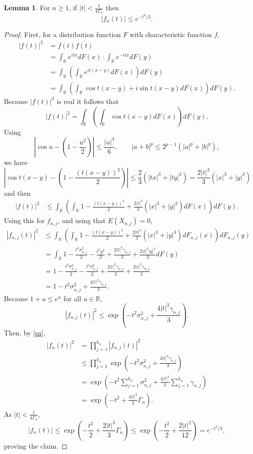 \documentclass{article}
\theoremstyle{definition}
\newtheorem{lemma}[theorem]{Lemma}
\theoremstyle{definition}
\begin{document}
\begin{lemma}
For $n \geq 1$, if $|t|<\frac{1}{4\Gamma_n}$ then
\[
|f_n(t)| \leq e^{-t^2/3}.
\] 
\label{Gamma2}
\end{lemma}
\begin{proof}
First, for a distribution function $F$ with characteristic function $f$,
\begin{align*}
|f(t)|^2 &= f(t) \overline{f(t)}\\
&= \int_\mathbb{R} e^{itx} dF(x) \cdot \int_\mathbb{R} e^{-itx} dF(y)\\
&=\int_\mathbb{R}\left( \int_\mathbb{R} e^{it(x-y)} dF(x) \right) dF(y)\\
&=\int_\mathbb{R}\left( \int_\mathbb{R} \cos t(x-y)+i\sin t(x-y) dF(x) \right) dF(y).
\end{align*}
Because $|f(t)|^2$ is real it follows that
\[
|f(t)|^2 = \int_\mathbb{R}\left( \int_\mathbb{R} \cos t(x-y) dF(x) \right) dF(y).
\]
Using
\[
\left| \cos u - \left(1 - \frac{u^2}{2}\right) \right| \leq \frac{|u|^3}{6},\qquad
|a+b|^p \leq 2^{p-1}(|a|^p+|b|^p), 
\]
we have
\[
\left| \cos t(x-y) -\left(1-\frac{(t(x-y))^2}{2} \right)\right| \leq \frac{2}{3}\left(|tx|^3+|ty|^3\right)
=\frac{2|t|^3}{3}(|x|^3+|y|^3)
\]
and then
\begin{align*}
|f(t)|^2&\leq \int_\mathbb{R} \left( \int_\mathbb{R} 1-\frac{(t(x-y))^2}{2}  
+ \frac{2|t|^3}{3}(|x|^3+|y|^3) dF(x) \right) dF(y).
\end{align*}
Using this for $f_{n,j}$, and using that $E(X_{n,j})=0$,
\begin{align*}
|f_{n,j}(t)|^2&\leq  \int_\mathbb{R} \left( \int_\mathbb{R} 1-\frac{(t(x-y))^2}{2}  
+\frac{2|t|^3}{3}(|x|^3+|y|^3) dF_{n,j}(x) \right) dF_{n,j}(y)\\
&=\int_{\mathbb{R}} 1-\frac{t^2 \sigma_{n,j}^2}{2}- \frac{t^2 y^2}{2} + \frac{2|t|^3 \gamma_{n,j}}{3}
+\frac{2|t|^3 |y|^3}{3} dF(y)\\
&=1-\frac{t^2 \sigma_{n,j}^2}{2} - \frac{t^2 \sigma_{n,j}^2}{2} + \frac{2|t|^3 \gamma_{n,j}}{3} + \frac{2|t|^3 \gamma_{n,j}}{3}\\
&=1-t^2 \sigma_{n,j}^2 + \frac{4 |t|^3 \gamma_{n,j}}{3}.
\end{align*}
Because $1+u \leq e^u$ for all $u \in \mathbb{R}$,
\[
|f_{n,j}(t)|^2 \leq \exp\left(-t^2 \sigma_{n,j}^2 + \frac{4 |t|^3 \gamma_{n,j}}{3}\right).
\]
Then, by \eqref{sn},
\begin{align*}
|f_n(t)|^2&=\prod_{j=1}^{k_n} |f_{n,j}(t)|^2\\
&\leq \prod_{j=1}^{k_n}  \exp\left(-t^2 \sigma_{n,j}^2 + \frac{4 |t|^3 \gamma_{n,j}}{3}\right)\\
&=\exp\left(-t^2 \sum_{j=1}^{k_n} \sigma_{n,j}^2 + \frac{4|t|^3}{3} \sum_{j=1}^{k_n} \gamma_{n,j} \right)\\
&=\exp\left(-t^2 + \frac{4|t|^3}{3} \Gamma_n \right).
\end{align*}
As $|t| < \frac{1}{4\Gamma_n}$,
\[
|f_n(t)| \leq \exp\left(-\frac{t^2}{2} + \frac{2|t|^3}{3} \Gamma_n \right)
\leq \exp\left(-\frac{t^2}{2} + \frac{2|t|^2}{12}\right)
=e^{-t^2/3},
\]
proving the claim.
\end{proof}
\end{document}
